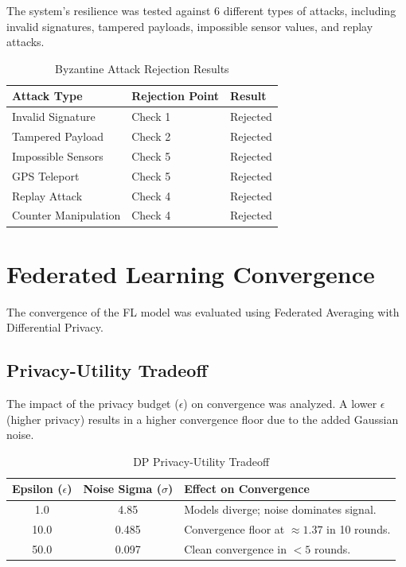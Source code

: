 The system's resilience was tested against 6 different types of attacks, including invalid signatures, tampered payloads, impossible sensor values, and replay attacks.

\begin{table}[htb]
\centering
\caption{Byzantine Attack Rejection Results}
\label{tab:bft_results}
\begin{tabular}{|l|l|l|}
\hline
\textbf{Attack Type} & \textbf{Rejection Point} & \textbf{Result} \\
\hline
Invalid Signature & Check 1 & Rejected \\
Tampered Payload & Check 2 & Rejected \\
Impossible Sensors & Check 5 & Rejected \\
GPS Teleport & Check 5 & Rejected \\
Replay Attack & Check 4 & Rejected \\
Counter Manipulation & Check 4 & Rejected \\
\hline
\end{tabular}
\end{table}

\section{Federated Learning Convergence}

The convergence of the FL model was evaluated using Federated Averaging with Differential Privacy.

\subsection{Privacy-Utility Tradeoff}
The impact of the privacy budget ($\epsilon$) on convergence was analyzed. A lower $\epsilon$ (higher privacy) results in a higher convergence floor due to the added Gaussian noise.

\begin{table}[htb]
\centering
\caption{DP Privacy-Utility Tradeoff}
\label{tab:dp_tradeoff}
\begin{tabular}{|c|c|l|}
\hline
\textbf{Epsilon ($\epsilon$)} & \textbf{Noise Sigma ($\sigma$)} & \textbf{Effect on Convergence} \\
\hline
1.0 & 4.85 & Models diverge; noise dominates signal. \\
10.0 & 0.485 & Convergence floor at $\approx 1.37$ in 10 rounds. \\
50.0 & 0.097 & Clean convergence in $< 5$ rounds. \\
\hline
\end{tabular}
\end{table}

